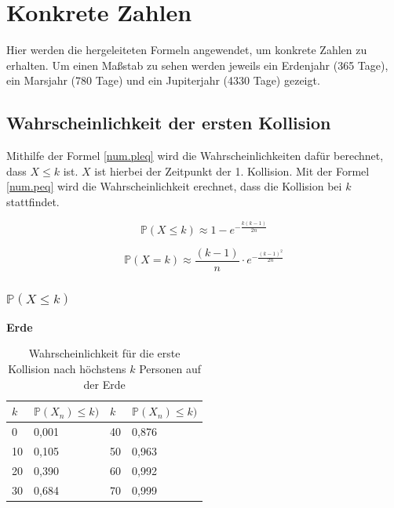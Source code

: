 \documentclass[../main.tex]{subfiles}
\begin{document}
\section{Konkrete Zahlen}
Hier werden die hergeleiteten Formeln angewendet, um konkrete Zahlen zu erhalten. Um einen Maßstab zu sehen werden jeweils ein Erdenjahr (365 Tage), ein Marsjahr (780 Tage) und ein Jupiterjahr (4330 Tage) gezeigt.
\subsection{Wahrscheinlichkeit der ersten Kollision}

Mithilfe der Formel \ref{num.pleq} wird die Wahrscheinlichkeiten dafür berechnet, dass $X \leq k$ ist. $X$ ist hierbei der Zeitpunkt der 1. Kollision. Mit der Formel \ref{num.peq} wird die Wahrscheinlichkeit erechnet, dass die Kollision bei $k$ stattfindet.

\begin{equation}
 \mathbb{P}(X \leq k) \approx 1 - e^{- \frac{k(k-1)}{2n}}
 \label{num.pleq}
\end{equation}

\begin{equation}
 \mathbb{P}(X = k) \approx \frac{(k-1)}{n} \cdot e^{- \frac{(k-1)^2}{2n}}
 \label{num.peq}
\end{equation}

\subsubsection{$\mathbb{P}(X \leq k)$}

\textbf{Erde}

\begin{table}[h]
\centering
\begin{tabular}{|l|l|l|l|}
\hline
$k$  & $\mathbb{P}(X_{n}) \leq k)$ & $k$  & $\mathbb{P}(X_{n}) \leq k)$ \\ \hline
0  & 0,001            & 40 & 0,876            \\
10 & 0,105            & 50 & 0,963            \\
20 & 0,390            & 60 & 0,992            \\
30 & 0,684            & 70 & 0,999            \\ \hline
\end{tabular}
\caption{\label{num.tpe} Wahrscheinlichkeit für die erste Kollision nach höchstens $k$ Personen auf der Erde}
\end{table}
\end{document}
